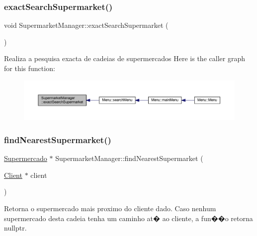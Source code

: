 \subsubsection{\texorpdfstring{exact\+Search\+Supermarket()}{exactSearchSupermarket()}}
{\footnotesize\ttfamily void Supermarket\+Manager\+::exact\+Search\+Supermarket (\begin{DoxyParamCaption}{ }\end{DoxyParamCaption})}

Realiza a pesquisa exacta de cadeias de supermercados Here is the caller graph for this function\+:
\nopagebreak
\begin{figure}[H]
\begin{center}
\leavevmode
\includegraphics[width=350pt]{class_supermarket_manager_a9841cd0c676abc1f128a68bb71bc2683_icgraph}
\end{center}
\end{figure}
\mbox{\label{class_supermarket_manager_a3869489967f0a60d1b9c36a85b05998b}} 
\subsubsection{\texorpdfstring{find\+Nearest\+Supermarket()}{findNearestSupermarket()}}
{\footnotesize\ttfamily \hyperlink{class_supermercado}{Supermercado} $\ast$ Supermarket\+Manager\+::find\+Nearest\+Supermarket (\begin{DoxyParamCaption}\item[{\hyperlink{class_client}{Client} $\ast$}]{client }\end{DoxyParamCaption})}

Retorna o supermercado mais proximo do cliente dado. Caso nenhum supermercado desta cadeia tenha um caminho at� ao cliente, a fun��o retorna \textquotesingle{}nullptr\textquotesingle{}.

